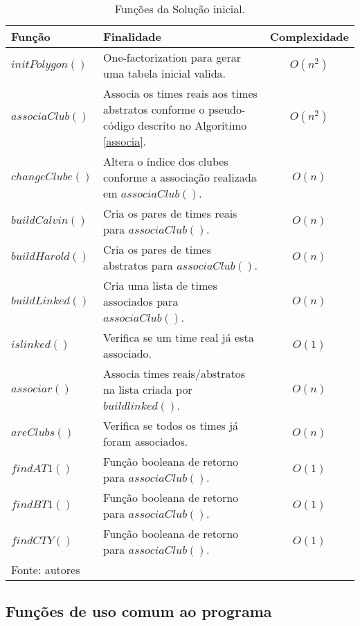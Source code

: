 \documentclass[12pt,a4paper]{article}
\begin{document}
\begin{table}[H]
	\renewcommand{\arraystretch}{1}
	\centering
	\caption{Funções da Solução inicial.}
	\label{tab:s0}
	\begin{tabular}{p{2.7cm} p{9.5cm} c}
		\toprule 
		Função & Finalidade & Complexidade \\ 
		\midrule
		$initPolygon()$ & One-factorization para gerar uma tabela inicial valida. & $O(n^2)$ \\
		$associaClub()$ & Associa os times reais aos times abstratos conforme o pseudo-código descrito no Algorítimo \ref{associa}. & $O(n^2)$ \\
		$changeClube()$ & Altera o índice dos clubes conforme a associação realizada em $associaClub()$. & $O(n)$ \\
		$buildCalvin()$ & Cria os pares de times reais para $associaClub()$. & $O(n)$ \\
		$buildHarold()$ & Cria os pares de times abstratos para $associaClub()$. & $O(n)$ \\
		$buildLinked()$ & Cria uma lista de times associados para $associaClub()$. & $O(n)$ \\
		$islinked()$ & Verifica se um time real já esta associado. & $O(1)$ \\
		$associar()$ & Associa times reais/abstratos na lista criada por $buildlinked()$. & $O(n)$ \\
		$areClubs()$ & Verifica se todos os times já foram associados. & $O(n)$ \\
		$findAT1()$ & Função booleana de retorno para $associaClub()$. & $O(1)$ \\
		$findBT1()$ & Função booleana de retorno para $associaClub()$. & $O(1)$ \\
		$findCTY()$ & Função booleana de retorno para $associaClub()$. & $O(1)$ \\
		\bottomrule
		\footnotesize Fonte: autores
	\end{tabular}
\end{table}

\subsection{Funções de uso comum ao programa}
\end{document}
